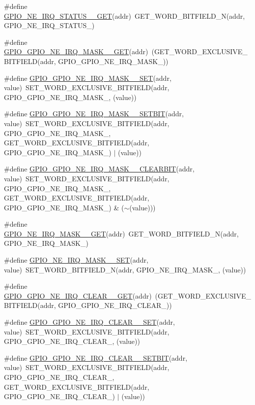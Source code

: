 \begin{DoxyCompactItemize}
\item 
\#define \hyperlink{a00554_a3339c3212f5eaf58c4bdfbffdec854ec}{GPIO\_\-NE\_\-IRQ\_\-STATUS\_\_\-GET}(addr)~GET\_\-WORD\_\-BITFIELD\_\-N(addr, GPIO\_\-NE\_\-IRQ\_\-STATUS\_)
\item 
\#define \hyperlink{a00554_ad287dea665ffc8472888dcb8ed19456d}{GPIO\_\-GPIO\_\-NE\_\-IRQ\_\-MASK\_\_\-GET}(addr)~(GET\_\-WORD\_\-EXCLUSIVE\_\-BITFIELD(addr, GPIO\_\-GPIO\_\-NE\_\-IRQ\_\-MASK\_))
\item 
\#define \hyperlink{a00554_a8a96853c6d61a3ec75f5dfb0b0ed344e}{GPIO\_\-GPIO\_\-NE\_\-IRQ\_\-MASK\_\_\-SET}(addr, value)~SET\_\-WORD\_\-EXCLUSIVE\_\-BITFIELD(addr, GPIO\_\-GPIO\_\-NE\_\-IRQ\_\-MASK\_, (value))
\item 
\#define \hyperlink{a00554_a5aabba9428d76513d81fd4453c5c84a4}{GPIO\_\-GPIO\_\-NE\_\-IRQ\_\-MASK\_\_\-SETBIT}(addr, value)~SET\_\-WORD\_\-EXCLUSIVE\_\-BITFIELD(addr, GPIO\_\-GPIO\_\-NE\_\-IRQ\_\-MASK\_, GET\_\-WORD\_\-EXCLUSIVE\_\-BITFIELD(addr, GPIO\_\-GPIO\_\-NE\_\-IRQ\_\-MASK\_) $|$ (value))
\item 
\#define \hyperlink{a00554_add07236abcd42b18aa6f5ff710f8bd74}{GPIO\_\-GPIO\_\-NE\_\-IRQ\_\-MASK\_\_\-CLEARBIT}(addr, value)~SET\_\-WORD\_\-EXCLUSIVE\_\-BITFIELD(addr, GPIO\_\-GPIO\_\-NE\_\-IRQ\_\-MASK\_, GET\_\-WORD\_\-EXCLUSIVE\_\-BITFIELD(addr, GPIO\_\-GPIO\_\-NE\_\-IRQ\_\-MASK\_) \& ($\sim$(value)))
\item 
\#define \hyperlink{a00554_ac66ce766622a9d15362afcbe47de1118}{GPIO\_\-NE\_\-IRQ\_\-MASK\_\_\-GET}(addr)~GET\_\-WORD\_\-BITFIELD\_\-N(addr, GPIO\_\-NE\_\-IRQ\_\-MASK\_)
\item 
\#define \hyperlink{a00554_a407f6656db93c80abf397079d0fde9ca}{GPIO\_\-NE\_\-IRQ\_\-MASK\_\_\-SET}(addr, value)~SET\_\-WORD\_\-BITFIELD\_\-N(addr, GPIO\_\-NE\_\-IRQ\_\-MASK\_, (value))
\item 
\#define \hyperlink{a00554_a20b51546a14b5dd83909db09d6e615ba}{GPIO\_\-GPIO\_\-NE\_\-IRQ\_\-CLEAR\_\_\-GET}(addr)~(GET\_\-WORD\_\-EXCLUSIVE\_\-BITFIELD(addr, GPIO\_\-GPIO\_\-NE\_\-IRQ\_\-CLEAR\_))
\item 
\#define \hyperlink{a00554_ac72520d5d33881b5943a34777b678082}{GPIO\_\-GPIO\_\-NE\_\-IRQ\_\-CLEAR\_\_\-SET}(addr, value)~SET\_\-WORD\_\-EXCLUSIVE\_\-BITFIELD(addr, GPIO\_\-GPIO\_\-NE\_\-IRQ\_\-CLEAR\_, (value))
\item 
\#define \hyperlink{a00554_a0508163162729b0d576d1939bd72d8c7}{GPIO\_\-GPIO\_\-NE\_\-IRQ\_\-CLEAR\_\_\-SETBIT}(addr, value)~SET\_\-WORD\_\-EXCLUSIVE\_\-BITFIELD(addr, GPIO\_\-GPIO\_\-NE\_\-IRQ\_\-CLEAR\_, GET\_\-WORD\_\-EXCLUSIVE\_\-BITFIELD(addr, GPIO\_\-GPIO\_\-NE\_\-IRQ\_\-CLEAR\_) $|$ (value))

\end{DoxyCompactItemize}
